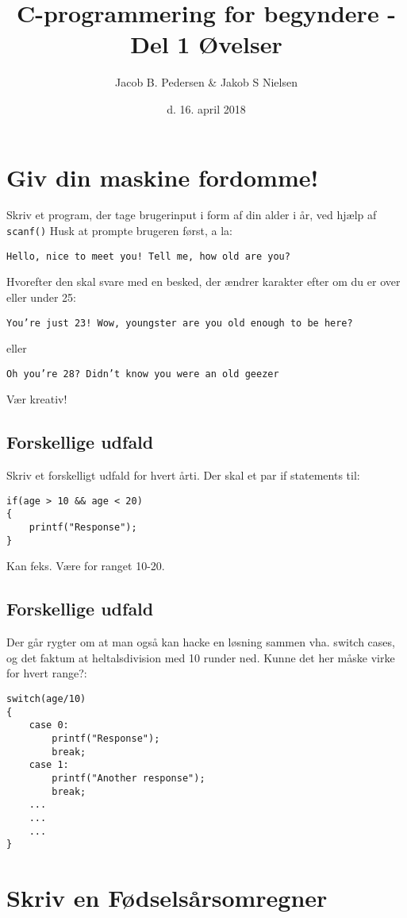 \documentclass[hidelinks]{article} %
\title{C-programmering for begyndere - Del 1
 		\break
 		\break
		\large Øvelser} %
\date{d. 16. april 2018} %
\author{Jacob B. Pedersen \break \& \break Jakob S Nielsen} %
\begin{document}

\section{Giv din maskine fordomme!}	
Skriv et program, der tage brugerinput i form af din alder i år, ved hjælp af \lstinline{scanf()}
Husk at prompte brugeren først, a la:
\begin{lstlisting}
Hello, nice to meet you! Tell me, how old are you?
\end{lstlisting}
Hvorefter den skal svare med en besked, der ændrer karakter efter om du er over eller under 25:
\begin{lstlisting}
You’re just 23! Wow, youngster are you old enough to be here?
\end{lstlisting}
eller
\begin{lstlisting}
Oh you’re 28? Didn’t know you were an old geezer
\end{lstlisting}
Vær kreativ!

\subsection{Forskellige udfald}
Skriv et forskelligt udfald for hvert årti. Der skal et par if statements til:
\begin{lstlisting}
if(age > 10 && age < 20)
{
	printf("Response");
}
\end{lstlisting}
Kan feks. Være for ranget 10-20.

\subsection{Forskellige udfald}
Der går rygter om at man også kan hacke en løsning sammen vha. switch cases, og det faktum at heltalsdivision med 10 runder ned. Kunne det her måske virke for hvert range?:
\begin{lstlisting}
switch(age/10)
{
	case 0:
		printf("Response");
		break;
	case 1:
		printf("Another response");
		break;
	...
	...
	...
}
\end{lstlisting}

\section{Skriv en Fødselsårsomregner}
	
\end{document}
